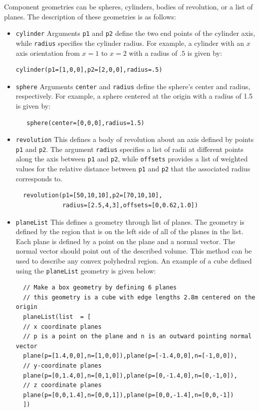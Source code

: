 \documentclass{article}
\begin{document}
\begin{enumerate}
  Component geometries can be spheres, cylinders, bodies of
  revolution, or a list of planes.  The description of these
  geometries is as follows:
\begin{itemize}
\item {\tt cylinder}
   Arguments {\tt p1} and {\tt p2} define the two end points of the
   cylinder axis, while {\tt radius} specifies the cylinder radius.
   For example, a cylinder with an $x$ axis orientation from $x=1$ to
   $x=2$ with a radius of $.5$ is given by:
\begin{verbatim}
cylinder(p1=[1,0,0],p2=[2,0,0],radius=.5)
\end{verbatim}
\item {\tt sphere}
   Arguments {\tt center} and {\tt radius} define the sphere's center
   and radius, respectively.  For example, a sphere centered at the
   origin with a radius of 1.5 is given by:
\begin{verbatim}
   sphere(center=[0,0,0],radius=1.5) 
\end{verbatim}
\item {\tt revolution}
  This defines a body of revolution about an axis defined by points
  {\tt p1} and {\tt p2}.  The argument {\tt radius} specifies a list of radii at
  different points along the axis between {\tt p1} and {\tt p2}, while
  {\tt offsets} provides a list of weighted values for the relative
  distance between {\tt p1} and {\tt p2} that the associated radius
  corresponds to.
\begin{verbatim}
  revolution(p1=[50,10,10],p2=[70,10,10],
             radius=[2.5,4,3],offsets=[0,0.62,1.0])
\end{verbatim}
\item{\tt planeList} This defines a geometry through list of planes.
  The geometry is defined by the region that is on the left side of
  all of the planes in the list.  Each plane is defined by a point on
  the plane and a normal vector.  The normal vector should point out
  of the described volume. This method can be used to describe any
  convex polyhedral region.  An example of a cube defined using 
  the {\tt planeList} geometry is given below:
\begin{verbatim}
  // Make a box geometry by defining 6 planes
  // this geometry is a cube with edge lengths 2.8m centered on the origin
  planeList(list  = [
  // x coordinate planes
  // p is a point on the plane and n is an outward pointing normal vector
  plane(p=[1.4,0,0],n=[1,0,0]),plane(p=[-1.4,0,0],n=[-1,0,0]),
  // y-coordinate planes
  plane(p=[0,1.4,0],n=[0,1,0]),plane(p=[0,-1.4,0],n=[0,-1,0]),
  // z coordinate planes
  plane(p=[0,0,1.4],n=[0,0,1]),plane(p=[0,0,-1.4],n=[0,0,-1])
  ])
\end{verbatim}
\end{itemize}


\end{enumerate}
\end{document}
